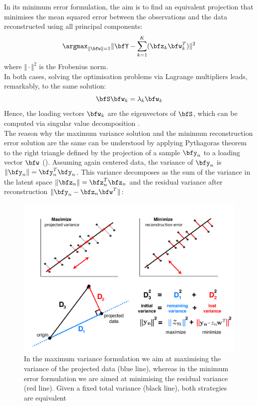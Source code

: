 In its minimum error formulation, the aim is to find an equivalent projection that minimises the mean squared error between the observations and the data reconstructed using all principal components:
\[
	\argmax_{\|\bfw\|=1} \Vert \bfY - \sum_{k=1}^{K} (\bfz_k \bfw_k^T) \Vert^{2}
\]
where $\Vert \cdot \Vert^{2}$ is the Frobenius norm.\\

In both cases, solving the optimisation problems via Lagrange multipliers leads, remarkably, to the same solution:
\begin{equation}
	\bfS \bfw_k = \lambda_k \bfw_k
\end{equation}
Hence, the loading vectors $\bfw_k$ are the eigenvectors of $\bfS$, which can be computed via singular value decomposition \cite{Bishop}.\\

The reason why the maximum variance solution and the minimum reconstruction error solution are the same can be understood by applying Pythagoras theorem to the right triangle defined by the projection of a sample $\bfy_{n}$ to a loading vector $\bfw$ ().
Assuming again centered data, the variance of $\bfy_{n}$ is $\|\bfy_{n}\| = \bfy_{n}^T \bfy_{n}$. This variance decomposes as the sum of the variance in the latent space $\|\bfz_{n}\| = \bfz_{n}^T \bfz_{n}$ and the residual variance after reconstruction $\|\bfy_{n} - \bfz_{n} \bfw^T \|$:

\begin{figure}[H]
	\centering
	\includegraphics[width=0.9\linewidth]{pca2}
	\caption[Maximizing the variance in the principal component space is equivalent to minimizing the data reconstruction error]{In the maximum variance formulation we aim at maximising the variance of the projected data (blue line), whereas in the minimum error formulation we are aimed at minimising the residual variance (red line). Given a fixed total variance (black line), both strategies are equivalent}
	\label{fig:pca2}
\end{figure}

